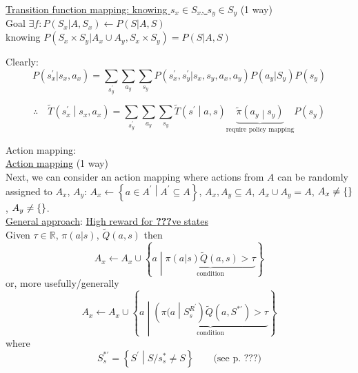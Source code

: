 \underline{Transition function mapping: knowing $s_x\in S_x$, $s_y\in S_y$} (1 way)\\

Goal $\exists f:P(S_x|A,S_x)\leftarrow P(S|A,S)$\\
knowing $P(S_x \times S_y | A_x \cup A_y, S_x \times S_y)=P(S|A,S)$

Clearly: 
\begin{equation*}
P(s^\prime_x|s_x,a_x) = \sum_{s_y^\prime}\sum_{a_y}\sum_{s_y} P\left( s_x^\prime,s_y^\prime|s_x,s_y,a_x,a_y\right)P\left(a_y|S_y \right)P\left( s_y \right)
\end{equation*}

\begin{equation*}
\therefore\quad\tilde{T}\left( s^\prime_x \middle| s_x, a_x \right) = \sum_{s^\prime_y} \sum_{a_y} \sum_{s_y} \tilde{T}\left( s^\prime \middle| a, s  \right) \underbrace{\tilde{\pi}\left( a_y \middle| s_y \right)}_{\text{require policy mapping}}P(s_y)
\end{equation*}

Action mapping:\\

\underline{Action mapping} (1 way)\\

Next, we can consider an action mapping where actions from $A$ can be randomly assigned to $A_x$, $A_y$: $A_x \leftarrow \left\{ a\in A^\prime \middle| A^\prime \subseteq A \right \}$, $A_x, A_y\subseteq A$, $A_x \cup A_y = A$, $A_x \neq \{ \null \}$, $A_y \neq	 \{ \null \}$.\\

\underline{General approach}: \underline{High reward for \textbf{???}ve states}\\

Given $\tau \in \mathbb{R}$, $\pi(a|s)$, $\tilde{Q}(a,s)$ then 
\begin{equation*}
A_x \leftarrow A_x \cup \left\{ a  \middle| \underbrace{ \pi(a|s) \tilde{Q}(a,s) > \tau }_{\text{condition}} \right\}
\end{equation*}
or, more usefully/generally
\begin{equation*}
A_x \leftarrow A_x \cup \left\{ a \middle| \underbrace{ \left( \pi (a \middle|  S_s^{R^\prime} \right) \tilde{Q}(a,S^{*\prime}) > \tau }_{\text{condition}} \right\}
\end{equation*}
where
\begin{equation*}
S_s^{*\prime}=\left\{ S^\prime \middle| S/s_s^* \neq S\right\} \qquad\text{(see p. ???)}
\end{equation*}


